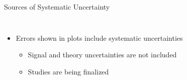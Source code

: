 \documentclass[aspectratio=169,xcolor=table]{beamer}
\begin{document}
    \begin{frame}[t]{Sources of Systematic Uncertainty}
      \begin{columns}[t]

        \begin{itemize}
          \item Errors shown in plots include systematic uncertainties
          \begin{itemize}
            \item Signal and \ttbar theory uncertainties are not included
            \item Studies are being finalized
          \end{itemize} 
        \end{itemize}



\end{columns}
\end{frame}
\end{document}
